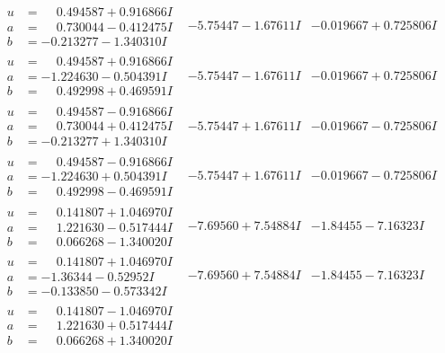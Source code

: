 \documentclass[1p]{elsarticle_modified}
\theoremstyle{definition}
\begin{document}
$$\begin{array}{c|c|c}
\begin{aligned}
u &= \phantom{-}0.494587 + 0.916866 I \\
a &= \phantom{-}0.730044 - 0.412475 I \\
b &= -0.213277 - 1.340310 I\end{aligned}
 & -5.75447 - 1.67611 I & -0.019667 + 0.725806 I \\ \hline\begin{aligned}
u &= \phantom{-}0.494587 + 0.916866 I \\
a &= -1.224630 - 0.504391 I \\
b &= \phantom{-}0.492998 + 0.469591 I\end{aligned}
 & -5.75447 - 1.67611 I & -0.019667 + 0.725806 I \\ \hline\begin{aligned}
u &= \phantom{-}0.494587 - 0.916866 I \\
a &= \phantom{-}0.730044 + 0.412475 I \\
b &= -0.213277 + 1.340310 I\end{aligned}
 & -5.75447 + 1.67611 I & -0.019667 - 0.725806 I \\ \hline\begin{aligned}
u &= \phantom{-}0.494587 - 0.916866 I \\
a &= -1.224630 + 0.504391 I \\
b &= \phantom{-}0.492998 - 0.469591 I\end{aligned}
 & -5.75447 + 1.67611 I & -0.019667 - 0.725806 I \\ \hline\begin{aligned}
u &= \phantom{-}0.141807 + 1.046970 I \\
a &= \phantom{-}1.221630 - 0.517444 I \\
b &= \phantom{-}0.066268 - 1.340020 I\end{aligned}
 & -7.69560 + 7.54884 I & -1.84455 - 7.16323 I \\ \hline\begin{aligned}
u &= \phantom{-}0.141807 + 1.046970 I \\
a &= -1.36344 - 0.52952 I \\
b &= -0.133850 - 0.573342 I\end{aligned}
 & -7.69560 + 7.54884 I & -1.84455 - 7.16323 I \\ \hline\begin{aligned}
u &= \phantom{-}0.141807 - 1.046970 I \\
a &= \phantom{-}1.221630 + 0.517444 I \\
b &= \phantom{-}0.066268 + 1.340020 I\end{aligned}

\end{array}$$
\end{document}
